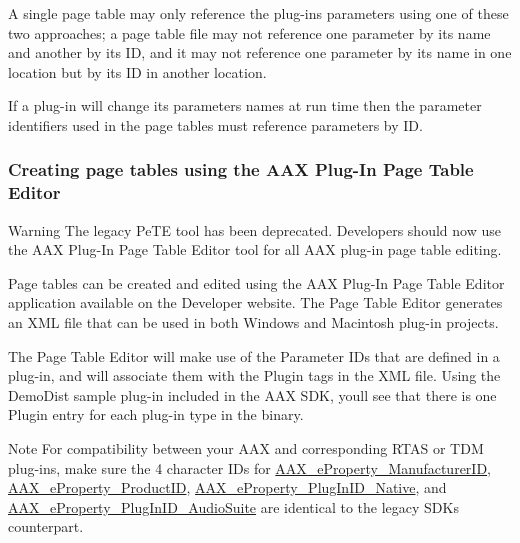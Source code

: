 A single page table may only reference the plug-\/in\textquotesingle{}s parameters using one of these two approaches; a page table file may not reference one parameter by its name and another by its I\+D, and it may not reference one parameter by its name in one location but by its I\+D in another location.

If a plug-\/in will change its parameters\textquotesingle{} names at run time then the parameter identifiers used in the page tables must reference parameters by I\+D.

\hypertarget{a00363_subsection_creating_page_tables_in_pete}{}\subsubsection{Creating page tables using the A\+A\+X Plug-\/\+In Page Table Editor}\label{a00363_subsection_creating_page_tables_in_pete}
 \begin{DoxyWarning}{Warning}
The legacy Pe\+T\+E tool has been deprecated. Developers should now use the A\+A\+X Plug-\/\+In Page Table Editor tool for all A\+A\+X plug-\/in page table editing.
\end{DoxyWarning}
Page tables can be created and edited using the A\+A\+X Plug-\/\+In Page Table Editor application available on the Developer website. The Page Table Editor generates an X\+M\+L file that can be used in both Windows and Macintosh plug-\/in projects.

The Page Table Editor will make use of the Parameter I\+Ds that are defined in a plug-\/in, and will associate them with the \textquotesingle{}Plugin\textquotesingle{} tags in the X\+M\+L file. Using the Demo\+Dist sample plug-\/in included in the A\+A\+X S\+D\+K, you\textquotesingle{}ll see that there is one Plugin entry for each plug-\/in type in the binary.

\begin{DoxyNote}{Note}
For compatibility between your A\+A\+X and corresponding R\+T\+A\+S or T\+D\+M plug-\/ins, make sure the 4 character I\+Ds for \hyperlink{a00283_a6571f4e41a5dd06e4067249228e2249ea996465cca29a2a15291d1c788ac5728c}{A\+A\+X\+\_\+e\+Property\+\_\+\+Manufacturer\+I\+D}, \hyperlink{a00283_a6571f4e41a5dd06e4067249228e2249ea3a41fcdff5af1a4fd19dcbca7b1ba6f3}{A\+A\+X\+\_\+e\+Property\+\_\+\+Product\+I\+D}, \hyperlink{a00283_a6571f4e41a5dd06e4067249228e2249ea89ca3dd6e96895cda14976c1b1ceb826}{A\+A\+X\+\_\+e\+Property\+\_\+\+Plug\+In\+I\+D\+\_\+\+Native}, and \hyperlink{a00283_a6571f4e41a5dd06e4067249228e2249ead3344696b8298a8b254add3d039ea927}{A\+A\+X\+\_\+e\+Property\+\_\+\+Plug\+In\+I\+D\+\_\+\+Audio\+Suite} are identical to the legacy S\+D\+K\textquotesingle{}s counterpart.
\end{DoxyNote}

